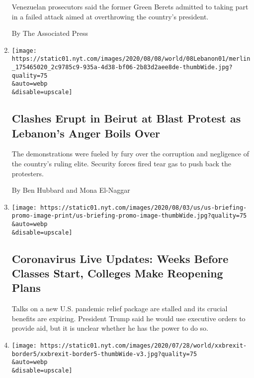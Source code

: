 \begin{enumerate}
  Venezuelan prosecutors said the former Green Berets admitted to taking
  part in a failed attack aimed at overthrowing the country's president.

  By The Associated Press
\item
  \href{/2020/08/08/world/middleeast/Beirut-explosion-protests-lebanon.html}{}

  \texttt{[image: https://static01.nyt.com/images/2020/08/08/world/08Lebanon01/merlin\_175465020\_2c9785c9-935a-4d38-bf06-2b83d2aee8de-thumbWide.jpg?quality=75\\\&auto=webp\\\&disable=upscale]}

  \hypertarget{clashes-erupt-in-beirut-at-blast-protest-as-lebanons-anger-boils-over}{%
  \subsection{Clashes Erupt in Beirut at Blast Protest as Lebanon's
  Anger Boils
  Over}\label{clashes-erupt-in-beirut-at-blast-protest-as-lebanons-anger-boils-over}}

  The demonstrations were fueled by fury over the corruption and
  negligence of the country's ruling elite. Security forces fired tear
  gas to push back the protesters.

  By Ben Hubbard and Mona El-Naggar
\item
  \href{/2020/08/08/world/coronavirus-updates.html}{}

  \texttt{[image: https://static01.nyt.com/images/2020/08/03/us/us-briefing-promo-image-print/us-briefing-promo-image-thumbWide.jpg?quality=75\\\&auto=webp\\\&disable=upscale]}

  \hypertarget{coronavirus-live-updates-weeks-before-classes-start-colleges-make-reopening-plans}{%
  \subsection{Coronavirus Live Updates: Weeks Before Classes Start,
  Colleges Make Reopening
  Plans}\label{coronavirus-live-updates-weeks-before-classes-start-colleges-make-reopening-plans}}

  Talks on a new U.S. pandemic relief package are stalled and its
  crucial benefits are expiring. President Trump said he would use
  executive orders to provide aid, but it is unclear whether he has the
  power to do so.
\item
  \href{/2020/08/08/world/europe/brexit-trucks-dover-mojo.html}{}

  \texttt{[image: https://static01.nyt.com/images/2020/07/28/world/xxbrexit-border5/xxbrexit-border5-thumbWide-v3.jpg?quality=75\\\&auto=webp\\\&disable=upscale]}


\end{enumerate}
